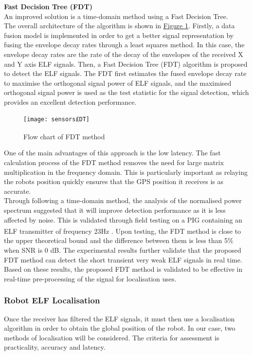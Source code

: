 \documentclass[11pt]{article}		%
\newcommand{\supercite}[1]{\textsuperscript{\cite{#1}}}		%
\newcommand{\figref}[1]{\hyperref[#1]{Figure \ref*{#1}}}    %
\begin{document}
		    \textbf{Fast Decision Tree (FDT)}\\
			An improved solution is a time-domain method using a Fast Decision Tree. 
			\\
	    	\hspace*{3ex}The overall architecture of the algorithm is shown in \figref{FDTFlowchart}. 
	    	Firstly, a data fusion model is implemented in order to get a better signal representation by fusing the envelope decay rates through a least squares method. 
	    	In this case, the envelope decay rates are the rate of the decay of the envelopes of the received X and Y axis ELF signals. 
	    	Then, a Fast Decision Tree (FDT) algorithm is proposed to detect the ELF signals. 
	    	The FDT first estimates the fused envelope decay rate to maximise the orthogonal signal power of ELF signals, and the maximised orthogonal signal power is used as the test statistic for the signal detection, which provides an excellent detection performance.
	        
	         \begin{figure}[h]
				\centering
				\texttt{[image: sensors£DT]}
				\caption{Flow chart of FDT method \supercite{FDT}}
				\label{FDTFlowchart}
			\end{figure}
			
			One of the main advantages of this approach is the low latency. 
			The fast calculation process of the FDT method removes the need for large matrix multiplication in the frequency domain. 
			This is particularly important as relaying the robots position quickly ensures that the GPS position it receives is as accurate. 
			\\
	    	\hspace*{3ex}Through following a time-domain method, the analysis of the normalised power spectrum suggested that it will improve detection performance as it is less affected by noise. 
	    	This is validated through field testing on a PIG containing an ELF transmitter of frequency 23Hz \supercite{FDT}. 
	    	Upon testing, the FDT method is close to the upper theoretical bound and the difference between them is less than 5\%  when SNR is 0 dB.
	    	The experimental results further validate that the proposed FDT method can detect the short transient very weak ELF signals in real time. 
	    	Based on these results, the proposed FDT method is validated to be effective in real-time pre-processing of the signal for localisation uses.
			
			\subsubsection{Robot ELF Localisation} \label{localisationSection}
			Once the receiver has filtered the ELF signals, it must then use a localisation algorithm in order to obtain the global position of the robot. In our case, two methods of localisation will be considered. The criteria for assessment is practicality, accuracy and latency. 
			
\end{document}
